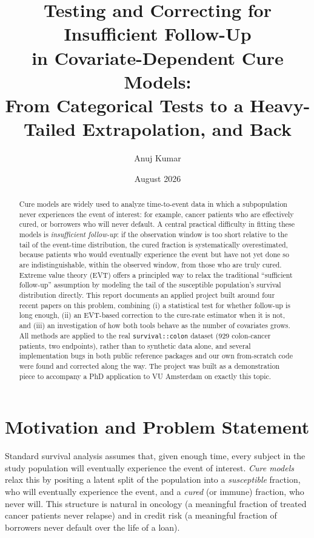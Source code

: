 \documentclass[11pt]{article}
\title{Testing and Correcting for Insufficient Follow-Up\\
in Covariate-Dependent Cure Models:\\
\large From Categorical Tests to a Heavy-Tailed Extrapolation, and Back}
\author{Anuj Kumar}
\date{August 2026}
\begin{document}
\maketitle

\begin{abstract}
Cure models are widely used to analyze time-to-event data in which a subpopulation
never experiences the event of interest: for example, cancer patients who are
effectively cured, or borrowers who will never default. A central practical
difficulty in fitting these models is \emph{insufficient follow-up}: if the observation
window is too short relative to the tail of the event-time distribution, the cured
fraction is systematically overestimated, because patients who would eventually
experience the event but have not yet done so are indistinguishable, within the
observed window, from those who are truly cured. Extreme value theory (EVT) offers
a principled way to relax the traditional ``sufficient follow-up'' assumption by
modeling the tail of the susceptible population's survival distribution directly.
This report documents an applied project built around four recent papers on this
problem, combining (i) a statistical test for whether follow-up is long enough,
(ii) an EVT-based correction to the cure-rate estimator when it is not, and
(iii) an investigation of how both tools behave as the number of covariates grows.
All methods are applied to the real \texttt{survival::colon} dataset (929
colon-cancer patients, two endpoints), rather than to synthetic data alone, and
several implementation bugs in both public reference packages and our own
from-scratch code were found and corrected along the way. The project was built as
a demonstration piece to accompany a PhD application to VU Amsterdam on exactly
this topic.
\end{abstract}

\tableofcontents

\section{Motivation and Problem Statement}

Standard survival analysis assumes that, given enough time, every subject in the
study population will eventually experience the event of interest. \emph{Cure
models} relax this by positing a latent split of the population into a
\emph{susceptible} fraction, who will eventually experience the event, and a
\emph{cured} (or immune) fraction, who never will. This structure is natural in
oncology (a meaningful fraction of treated cancer patients never relapse) and in
credit risk (a meaningful fraction of borrowers never default over the life of a
loan).
\end{document}
